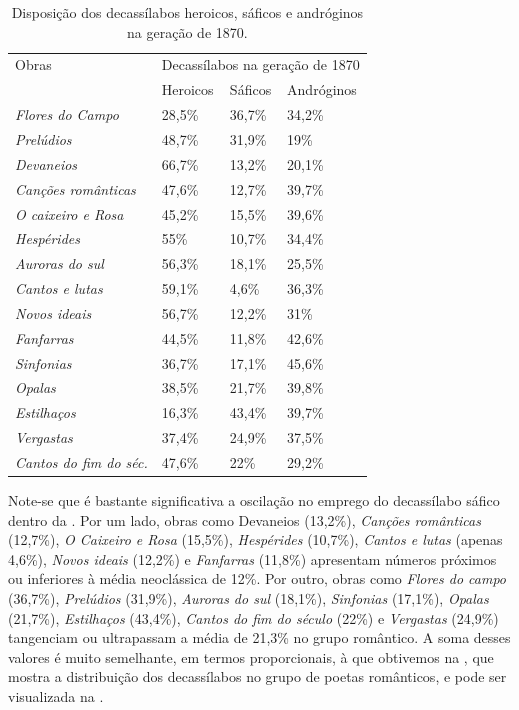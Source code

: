 \documentclass[portuguese]{textolivre}
\begin{document}
\begin{table}[htbp]
\centering
\begin{threeparttable}
\caption{Disposição dos decassílabos heroicos, sáficos e andróginos na geração de 1870.}
\label{tbl3}
\begin{tabular}{llll}
\toprule
Obras & \multicolumn{3}{l}{Decassílabos na geração de 1870} \\
& Heroicos & Sáficos & Andróginos \\
\midrule
\textit{Flores do Campo} &
28,5\% &
36,7\% &
34,2\% \\
\textit{Prelúdios} &
48,7\% &
31,9\% &
19\% \\
\textit{Devaneios} &
66,7\% &
13,2\% &
20,1\% \\
\textit{Canções românticas} &
47,6\% & 
12,7\% &
39,7\% \\
\textit{O caixeiro e Rosa} &
45,2\% &
15,5\% &
39,6\% \\
\textit{Hespérides} &
55\% &
10,7\% &
34,4\% \\
\textit{Auroras do sul} &
56,3\% &
18,1\% &
25,5\% \\
\textit{Cantos e lutas} &
59,1\% &
4,6\% &
36,3\% \\
\textit{Novos ideais} &
56,7\% & 
12,2\% &
31\% \\
\textit{Fanfarras} &
44,5\% &
11,8\% &
42,6\% \\
\textit{Sinfonias} &
36,7\% &
17,1\% &
45,6\% \\
\textit{Opalas} &
38,5\% &
21,7\% &
39,8\% \\
\textit{Estilhaços} &
16,3\% &
43,4\% &
39,7\% \\
\textit{Vergastas} &
37,4\% &
24,9\% &
37,5\% \\
\textit{Cantos do fim do séc.} &
47,6\% &
22\% &
29,2\% \\
\bottomrule
\end{tabular}
\end{threeparttable}
\end{table}

Note-se que é bastante significativa a oscilação no emprego do decassílabo sáfico dentro da . Por um lado, obras como Devaneios (13,2\%), \textit{Canções românticas} (12,7\%), \textit{O Caixeiro e Rosa} (15,5\%), \textit{Hespérides} (10,7\%), \textit{Cantos e lutas} (apenas 4,6\%), \textit{Novos ideais} (12,2\%) e \textit{Fanfarras} (11,8\%) apresentam números próximos ou inferiores à média neoclássica de 12\%. Por outro, obras como \textit{Flores do campo} (36,7\%), \textit{Prelúdios} (31,9\%), \textit{Auroras do sul} (18,1\%), \textit{Sinfonias} (17,1\%), \textit{Opalas} (21,7\%), \textit{Estilhaços} (43,4\%), \textit{Cantos do fim do século} (22\%) e \textit{Vergastas} (24,9\%) tangenciam ou ultrapassam a média de 21,3\% no grupo romântico. A soma desses valores é muito semelhante, em termos proporcionais, à que obtivemos na , que mostra a distribuição dos decassílabos no grupo de poetas românticos, e pode ser visualizada na .
\end{document}
